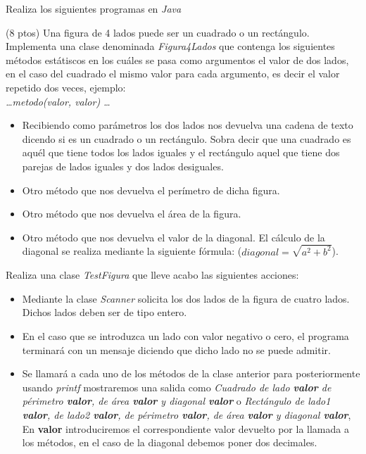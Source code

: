 \documentclass[addpoints,12pt]{exam}
\begin{document}
\begin{center}
\end{center}
\vspace{0.1in}
Realiza los siguientes programas en \emph{Java}
\begin{questions}
\question(8 ptos) Una figura de 4 lados puede ser un cuadrado o un rectángulo. Implementa una clase denominada \emph{Figura4Lados} que contenga los siguientes métodos estátiscos en los cuáles se pasa como argumentos el valor de dos lados, en el caso del cuadrado el mismo valor para cada argumento, es decir el valor repetido dos veces, ejemplo:\\ \emph{\dots metodo(valor, valor) \dots}
\begin{itemize}
\item Recibiendo como parámetros los dos lados nos devuelva una cadena de texto dicendo si es un cuadrado o un rectángulo. Sobra decir que una cuadrado es aquél que tiene todos los lados iguales y el rectángulo aquel que tiene dos parejas de lados iguales y dos lados desiguales.
\item Otro método que nos devuelva el perímetro de dicha figura.
\item Otro método que nos devuelva el área de la figura.
\item Otro método que nos devuelva el valor de la diagonal. El cálculo de la diagonal se realiza mediante la siguiente fórmula: ($diagonal = \sqrt{a^2 + b^2}$).
\end{itemize}
Realiza una clase \emph{TestFigura} que lleve acabo las siguientes acciones:
\begin{itemize}
\item Mediante la clase \emph{Scanner} solicita los dos lados de la figura de cuatro lados. Dichos lados deben ser de tipo entero.
\item En el caso que se introduzca un lado con valor negativo o cero, el programa terminará con un mensaje diciendo que dicho lado no se puede admitir.
\item Se llamará a cada uno de los métodos de la clase anterior para posteriormente usando \emph{printf} mostraremos una salida como \emph{Cuadrado de lado \textbf{valor} de périmetro \textbf{valor}, de área \textbf{valor} y diagonal \textbf{valor}} o \emph{Rectángulo de lado1 \textbf{valor}, de lado2 \textbf{valor}, de périmetro \textbf{valor}, de área \textbf{valor} y diagonal \textbf{valor}}, En \textbf{valor} introduciremos el correspondiente valor devuelto por la llamada a los métodos, en el caso de la diagonal debemos poner dos decimales.

\end{itemize}
\end{questions}
\end{document}
